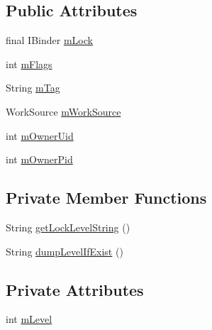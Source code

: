 \subsection*{Public Attributes}
\begin{DoxyCompactItemize}
\item 
final I\-Binder \hyperlink{classcom_1_1android_1_1server_1_1power_1_1PowerManagerService_1_1HtcCpuCtrl_a9c26de2babb8433dad620487e6da90ee}{m\-Lock}
\item 
int \hyperlink{classcom_1_1android_1_1server_1_1power_1_1PowerManagerService_1_1HtcCpuCtrl_a9658c794544e425656117e195286043f}{m\-Flags}
\item 
String \hyperlink{classcom_1_1android_1_1server_1_1power_1_1PowerManagerService_1_1HtcCpuCtrl_acd2763c41cf2375b632557850fa9f0cd}{m\-Tag}
\item 
Work\-Source \hyperlink{classcom_1_1android_1_1server_1_1power_1_1PowerManagerService_1_1HtcCpuCtrl_a29942ea13180d98f1a9e4ea444834d1b}{m\-Work\-Source}
\item 
int \hyperlink{classcom_1_1android_1_1server_1_1power_1_1PowerManagerService_1_1HtcCpuCtrl_ac14893ba75fd5aa8d1d1c7173adb90a0}{m\-Owner\-Uid}
\item 
int \hyperlink{classcom_1_1android_1_1server_1_1power_1_1PowerManagerService_1_1HtcCpuCtrl_adf0bb931ec82c6a5b68d8b2ab0c451b1}{m\-Owner\-Pid}
\end{DoxyCompactItemize}
\subsection*{Private Member Functions}
\begin{DoxyCompactItemize}
\item 
String \hyperlink{classcom_1_1android_1_1server_1_1power_1_1PowerManagerService_1_1HtcCpuCtrl_a56baa8905bc9d8a055b65b8a4f86a4fc}{get\-Lock\-Level\-String} ()
\item 
String \hyperlink{classcom_1_1android_1_1server_1_1power_1_1PowerManagerService_1_1HtcCpuCtrl_a095dd0137eb8fdb5155505205400d0c9}{dump\-Level\-If\-Exist} ()
\end{DoxyCompactItemize}
\subsection*{Private Attributes}
\begin{DoxyCompactItemize}
\item 
int \hyperlink{classcom_1_1android_1_1server_1_1power_1_1PowerManagerService_1_1HtcCpuCtrl_a6a210dc8e827717053a51bf27c637e0b}{m\-Level}
\end{DoxyCompactItemize}


